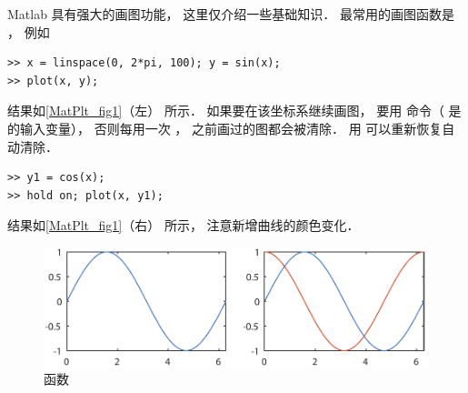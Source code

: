 

Matlab 具有强大的画图功能， 这里仅介绍一些基础知识． 最常用的画图函数是 ， 例如
\begin{lstlisting}[language=MatlabCom]
>> x = linspace(0, 2*pi, 100); y = sin(x);
>> plot(x, y);
\end{lstlisting}
结果如\autoref{MatPlt_fig1}（左） 所示． 如果要在该坐标系继续画图， 要用  命令（ 是  的输入变量）， 否则每用一次 ， 之前画过的图都会被清除． 用  可以重新恢复自动清除．
\begin{lstlisting}[language=MatlabCom]
>> y1 = cos(x);
>> hold on; plot(x, y1);
\end{lstlisting}
结果如\autoref{MatPlt_fig1}（右） 所示， 注意新增曲线的颜色变化．
\begin{figure}[ht]
\centering
\includegraphics[width=13cm]{./figures/MatPlt1.pdf}
\caption{ 函数} \label{MatPlt_fig1}
\end{figure}

